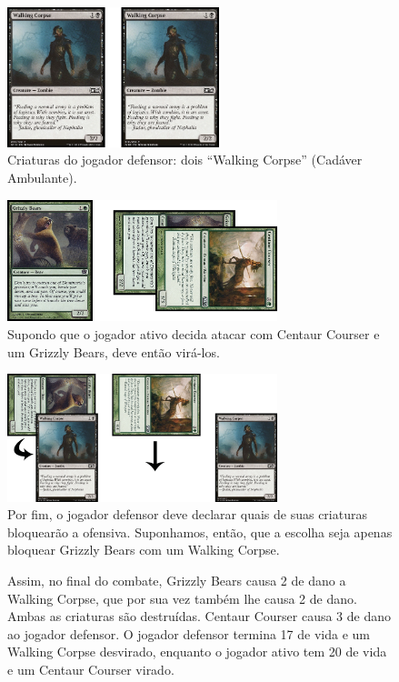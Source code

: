 \begin{figure}[!h]
  \centering
  \includegraphics[width=0.55\textwidth]{picstcc/blk1.png}
  \caption{Criaturas do jogador defensor: dois ``Walking Corpse'' (Cadáver Ambulante).}
  \label{beginblock}
\end{figure}

\begin{figure}[!h]
  \centering
  \includegraphics[width=0.7\textwidth]{picstcc/att2.png}
  \caption{Supondo que o jogador ativo decida atacar com Centaur Courser e um Grizzly Bears, deve então virá-los.}
  \label{declaredattackers}
\end{figure}

\begin{figure}[!h]
  \centering
  \includegraphics[width=0.7\textwidth]{picstcc/blk2.png}
  \caption{Por fim, o jogador defensor deve declarar quais de suas criaturas bloquearão a ofensiva. Suponhamos, então, que a escolha seja apenas bloquear Grizzly Bears com um Walking Corpse.}
  \label{declaredblockers}
\end{figure}

\begin{figure}
Assim, no final do combate, Grizzly Bears causa 2 de dano a Walking Corpse, que por sua vez também lhe causa 2 de dano. Ambas as criaturas são destruídas. Centaur Courser causa 3 de dano ao jogador defensor. O jogador defensor termina 17 de vida e um Walking Corpse desvirado, enquanto o jogador ativo tem 20 de vida e um Centaur Courser virado.
\end{figure}
